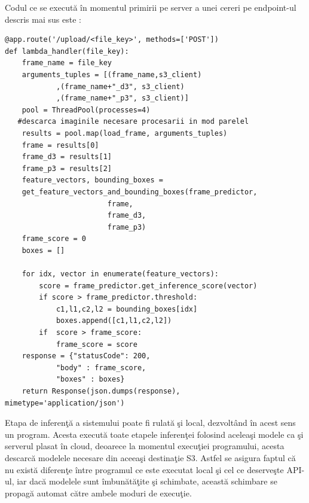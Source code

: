 \documentclass[a4paper,12pt]{report}
\begin{document}
Codul ce se execută în momentul primirii pe server a unei cereri pe endpoint-ul descris mai sus este : 
\begin{footnotesize}
\begin{lstlisting}
@app.route('/upload/<file_key>', methods=['POST'])
def lambda_handler(file_key):
    frame_name = file_key
    arguments_tuples = [(frame_name,s3_client)
			,(frame_name+"_d3", s3_client)
			,(frame_name+"_p3", s3_client)]
    pool = ThreadPool(processes=4)
   #descarca imaginile necesare procesarii in mod parelel
    results = pool.map(load_frame, arguments_tuples) 
    frame = results[0]
    frame_d3 = results[1]
    frame_p3 = results[2]
    feature_vectors, bounding_boxes = 
	get_feature_vectors_and_bounding_boxes(frame_predictor,
						frame,
						frame_d3,
						frame_p3)
    frame_score = 0
    boxes = []

    for idx, vector in enumerate(feature_vectors):
        score = frame_predictor.get_inference_score(vector)
        if score > frame_predictor.threshold:
            c1,l1,c2,l2 = bounding_boxes[idx]
            boxes.append([c1,l1,c2,l2])
        if  score > frame_score:
            frame_score = score
    response = {"statusCode": 200,
            "body" : frame_score,
            "boxes" : boxes}
    return Response(json.dumps(response),  mimetype='application/json')
\end{lstlisting}
\end{footnotesize}

\par Etapa de inferenţă a sistemului poate fi rulată şi local, dezvoltând în acest sens un program. Acesta execută toate etapele inferenţei folosind aceleaşi modele ca şi serverul plasat în cloud, deoarece la momentul execuţiei programului, acesta descarcă modelele necesare din aceeaşi destinaţie S3. Astfel se asigura faptul că nu există diferenţe între programul ce este executat local şi cel ce deserveşte API-ul, iar dacă modelele sunt îmbunătăţite şi schimbate, această schimbare se propagă automat către ambele moduri de execuţie.
\end{document}
